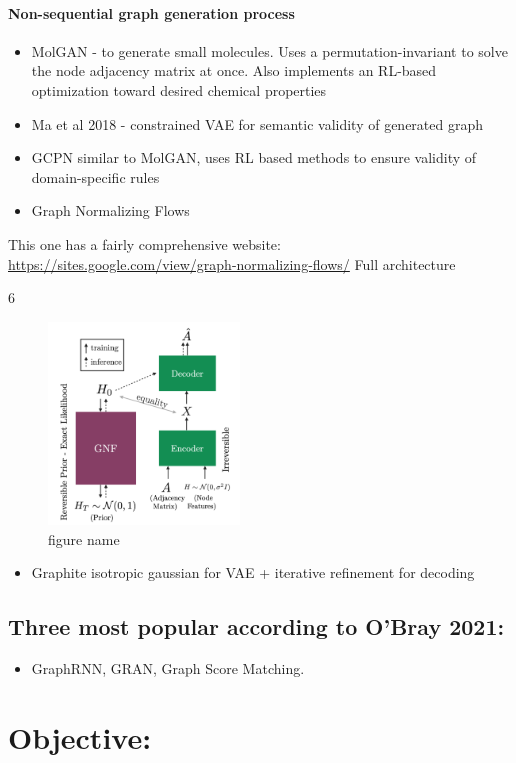 \documentclass[12pt]{article}
\begin{document}
\paragraph{Non-sequential graph generation process}
\label{sec:org532aaa6}
\begin{itemize}
\item MolGAN - to generate small molecules. Uses a permutation-invariant to solve the node adjacency matrix at once. Also implements an RL-based optimization toward desired chemical properties
\item Ma et al 2018 - constrained VAE for semantic validity of generated graph
\item GCPN similar to MolGAN, uses RL based methods to ensure validity of domain-specific rules
\item Graph Normalizing Flows
\end{itemize}
This one has a fairly comprehensive website: \url{https://sites.google.com/view/graph-normalizing-flows/}
Full architecture

6\begin{figure}[htbp]
\centering
\includegraphics[width=2.0in]{./images/full_arch_gnf.png}
\caption{\label{fig:figure name}figure name}
\end{figure}
\begin{itemize}
\item Graphite isotropic gaussian for VAE + iterative refinement for decoding
\end{itemize}
\subsection{Three most popular according to O'Bray 2021:}
\label{sec:org2822432}
\begin{itemize}
\item GraphRNN, GRAN, Graph Score Matching.
\end{itemize}

\section{Objective:}
\label{sec:orgbea99e2}
\end{document}
